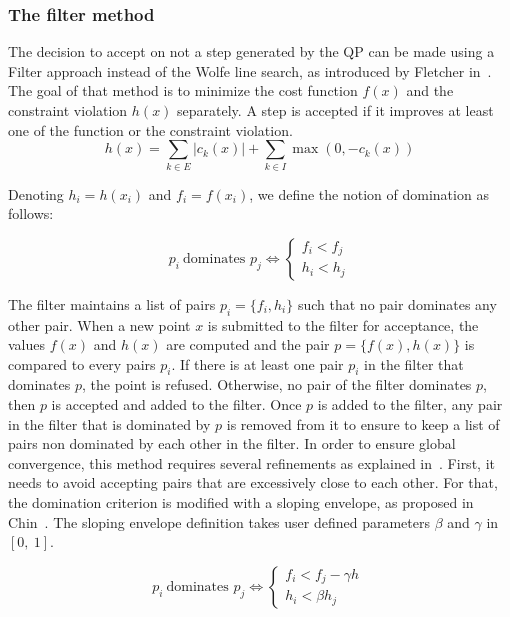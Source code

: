 \subsubsection{The filter method}
\label{ssub:the_filter_method}
The decision to accept on not a step generated by the QP can be made using a Filter approach instead of the Wolfe line search, as introduced by Fletcher in~\cite{fletcher:mathprog:2000}.
The goal of that method is to minimize the cost function $f(x)$ and the constraint violation $h(x)$ separately.
A step is accepted if it improves at least one of the function or the constraint violation.
\begin{equation}
  h(x) = \sum\limits_{k\in E} |c_k(x)| + \sum\limits_{k\in I} \max(0, -c_k(x))
\end{equation}

Denoting $h_i = h(x_i)$ and $f_i = f(x_i)$, we define the notion of domination as follows:
\begin{definition}
  \begin{equation}
    p_i\ \text{dominates }p_j \Leftrightarrow \left\{
        \begin{array}{l}
    f_i < f_j \\
    h_i < h_j
  \end{array}  \right.
  \end{equation}
\end{definition}

The filter maintains a list of pairs $p_i=\{f_i, h_i\}$ such that no pair dominates any other pair.
When a new point $x$ is submitted to the filter for acceptance, the values $f(x)$ and $h(x)$ are computed and the pair $p = \{f(x), h(x)\}$ is compared to every pairs $p_i$.
If there is at least one pair $p_i$ in the filter that dominates $p$, the point is refused.
Otherwise, no pair of the filter dominates $p$, then $p$ is accepted and added to the filter.
Once $p$ is added to the filter, any pair in the filter that is dominated by $p$ is removed from it to ensure to keep a list of pairs non dominated by each other in the filter.
In order to ensure global convergence, this method requires several refinements as explained in~\cite{fletcher:mathprog:2000}.
First, it needs to avoid accepting pairs that are excessively close to each other. For that, the domination criterion is modified with a sloping envelope, as proposed in Chin~\cite{chin:mathprog:2003}.
The sloping envelope definition takes user defined parameters $\beta$ and $\gamma$ in $[0,\ 1]$.

\begin{definition}
  \begin{equation}
    p_i\ \text{dominates }p_j \Leftrightarrow \left\{
        \begin{array}{l}
    f_i < f_j - \gamma h\ \\
    h_i < \beta h_j
  \end{array}  \right.
  \end{equation}
\end{definition}

